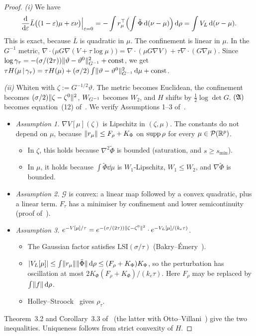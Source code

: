 \begin{proof}
\emph{(i)} We have
\[
  \frac{\mathrm{d}}{\mathrm{d}\varepsilon}\bar L\bigl((1-\varepsilon)\mu + \varepsilon\nu\bigr)\Big|_{\varepsilon=0}
  = -\int r_\mu^\top\Bigl(\int\tilde\Phi\,\mathrm{d}(\nu - \mu)\Bigr)\,\mathrm{d}\rho = \int V_L\,\mathrm{d}(\nu - \mu).
\]
This is exact, because $\bar L$ is quadratic in $\mu$. The confinement is linear in $\mu$. In the $G^{-1}$ metric,
$\nabla\cdot\bigl(\mu G\nabla(V + \tau\log\mu)\bigr) = \nabla\cdot(\mu G\nabla V) + \tau\nabla\cdot(G\nabla\mu)$. Since
$\log\gamma_\tau = -(\sigma/(2\tau))\lVert \vartheta - \vartheta^0\rVert^2_{G^{-1}} + \mathrm{const}$, we get
$\tau H(\mu\,|\,\gamma_\tau) = \tau H(\mu) + (\sigma/2)\int\lVert \vartheta - \vartheta^0\rVert^2_{G^{-1}}\,\mathrm{d}\mu
+ \mathrm{const}$.

\smallskip
\emph{(ii)} Whiten with $\zeta := G^{-1/2}\vartheta$. The metric becomes Euclidean, the confinement becomes
$(\sigma/2)\lVert \zeta - \zeta^0\rVert^2$, $W_{G^{-1}}$ becomes $W_2$, and $H$ shifts by $\frac12\log\det G$. $(\mathfrak{A})$ becomes
equation~(12) of~\cite{S3}. We verify Assumptions 1--3 of~\cite{S3}.
\begin{itemize}
  \item \emph{Assumption 1.} $\nabla V[\mu](\zeta)$ is Lipschitz in $(\zeta, \mu)$. The constants do not depend on
  $\mu$, because $\lVert r_\mu\rVert \le F_\rho + K_\Phi$ on $\operatorname{supp}\rho$ for every $\mu \in \mathcal{P}(\mathbb{R}^p)$.
  \begin{itemize}
    \item In $\zeta$, this holds because $\nabla^2\tilde\Phi$ is bounded (saturation, and $s \ge s_{\min}$).
    \item In $\mu$, it holds because $\int\tilde\Phi\dd\mu$ is $W_1$-Lipschitz, $W_1 \le W_2$, and
    $\nabla\tilde\Phi$ is bounded.
  \end{itemize}
  \item \emph{Assumption 2.} $\mathcal{G}$ is convex: a linear map followed by a convex quadratic, plus a linear term.
  $F_\tau$ has a minimiser by confinement and lower semicontinuity (proof of~\cite[Prop.~5.1]{S3}).
  \item \emph{Assumption 3.}
  $e^{-V[\mu]/\tau} = e^{-(\sigma/(2\tau))\lVert \zeta - \zeta^0\rVert^2}\cdot e^{-V_L[\mu]/(k_e\tau)}$.
  \begin{itemize}
    \item The Gaussian factor satisfies $\mathrm{LSI}(\sigma/\tau)$ (Bakry--\'Emery~\cite{be1985}).
    \item $\lvert V_L[\mu]\rvert \le \int\lVert r_\mu\rVert\lVert \tilde\Phi\rVert\,\mathrm{d}\rho \le (F_\rho + K_\Phi)K_\Phi$, so the
    perturbation has oscillation at most $2K_\Phi(F_\rho + K_\Phi)/(k_e\tau)$. Here $F_\rho$ may be replaced by
    $\int\lVert f\rVert\,\mathrm{d}\rho$.
    \item Holley--Stroock~\cite{hs1987} gives $\rho_\tau$.
  \end{itemize}
\end{itemize}
Theorem~3.2 and Corollary~3.3 of~\cite{S3} (the latter with Otto--Villani~\cite{ov2000}) give the two
inequalities. Uniqueness
follows from strict convexity of $H$.


\end{proof}
